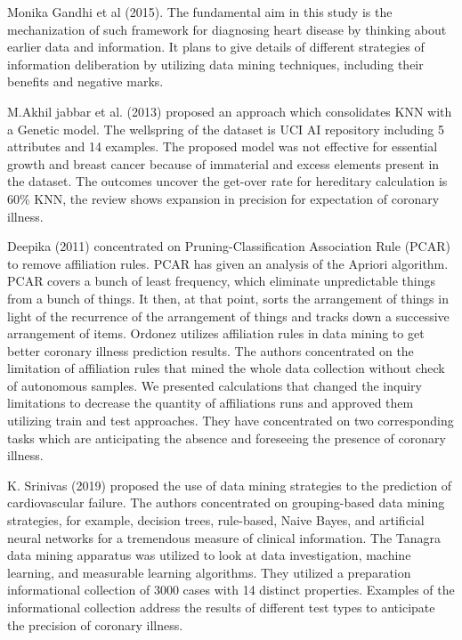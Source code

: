 Monika Gandhi et al (2015). The fundamental aim in this study is the mechanization of such framework for diagnosing heart disease by thinking about earlier data and information. It plans to give details of different strategies of information deliberation by utilizing data mining techniques, including their benefits and negative marks.

M.Akhil jabbar et al. (2013) proposed an approach which consolidates KNN with a Genetic model. The wellspring of the dataset is UCI AI repository including 5 attributes and 14 examples. The proposed model was not effective for essential growth and breast cancer because of immaterial and excess elements present in the dataset. The outcomes uncover the get-over rate for hereditary calculation is 60\% KNN, the review shows expansion in precision for expectation of coronary illness.

Deepika (2011) concentrated on Pruning-Classification Association Rule (PCAR) to remove affiliation rules. PCAR has given an analysis of the Apriori algorithm. PCAR covers a bunch of least frequency, which eliminate unpredictable things from a bunch of things. It then, at that point, sorts the arrangement of things in light of the recurrence of the arrangement of things and tracks down a successive arrangement of items. Ordonez utilizes affiliation rules in data mining to get better coronary illness prediction results. The authors concentrated on the limitation of affiliation rules that mined the whole data collection without check of autonomous samples. We presented calculations that changed the inquiry limitations to decrease the quantity of affiliations runs and approved them utilizing train and test approaches. They have concentrated on two corresponding tasks which are anticipating the absence and foreseeing the presence of coronary illness.

K. Srinivas (2019) proposed the use of data mining strategies to the prediction of cardiovascular failure. The authors concentrated on grouping-based data mining strategies, for example, decision trees, rule-based, Naive Bayes, and artificial neural networks for a tremendous measure of clinical information. The Tanagra data mining apparatus was utilized to look at data investigation, machine learning, and measurable learning algorithms. They utilized a preparation informational collection of 3000 cases with 14 distinct properties. Examples of the informational collection address the results of different test types to anticipate the precision of coronary illness.

